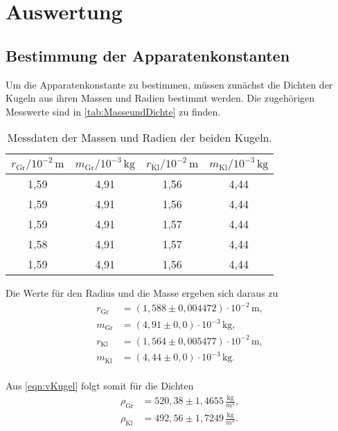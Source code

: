 \section{Auswertung}
\label{sec:Auswertung}

\subsection{Bestimmung der Apparatenkonstanten}
Um die Apparatenkonstante zu bestimmen, müssen zunächst die Dichten der Kugeln aus ihren Massen und Radien bestimmt werden. Die zugehörigen Messwerte sind
in \autoref{tab:MasseundDichte} zu finden.

\begin{table}[H]
  \centering
  \caption{Messdaten der Massen und Radien der beiden Kugeln.}
  \label{tab:MasseundDichte}
  \begin{tabular}{c c c c}
    \toprule
    $r_{\text{Gr}}/10^{-2}\,\si{\meter}$ & $m_{\text{Gr}}/10^{-3}\,\si{\kilogram}$ & $r_{\text{Kl}}/10^{-2}\,\si{\meter}$ & $m_{\text{Kl}}/10^{-3}\,\si{\kilogram}$ \\
    \midrule
    1,59 & 4,91 & 1,56 & 4,44 \\
    1,59 & 4,91 & 1,56 & 4,44 \\
    1,59 & 4,91 & 1,57 & 4,44 \\
    1,58 & 4,91 & 1,57 & 4,44 \\
    1,59 & 4,91 & 1,56 & 4,44 \\
    \bottomrule
  \end{tabular}
\end{table}

Die Werte für den Radius und die Masse ergeben sich daraus zu
\begin{align*}
  r_{\text{Gr}} &= (1,588\pm 0,004472) \cdot 10^{-2} \,\si{\meter}, \\
  m_{\text{Gr}} &= (4,91\pm 0,0) \cdot 10^{-3} \,\si{\kilogram}, \\
  r_{\text{Kl}} &= (1,564\pm 0,005477) \cdot 10^{-2} \,\si{\meter}, \\
  m_{\text{Kl}} &= (4,44\pm 0,0) \cdot 10^{-3} \,\si{\kilogram}. \\
\end{align*}

Aus \autoref{eqn:vKugel} folgt somit für die Dichten
\begin{align*}
  \rho_{\text{Gr}} &= 520,38\pm 1,4655 \,\frac{\si{\kg}}{\si{m^3}}, \\
  \rho_{\text{Kl}} &= 492,56\pm 1,7249 \,\frac{\si{\kg}}{\si{m^3}}. \\
\end{align*}

